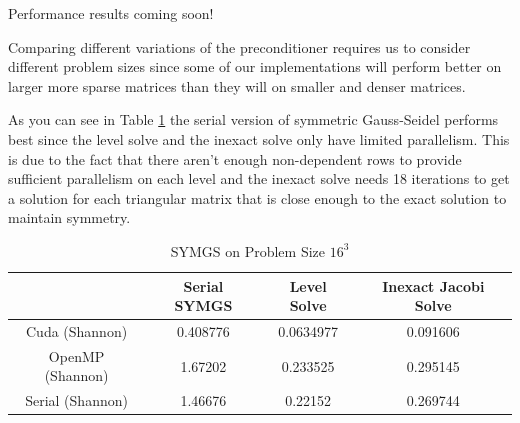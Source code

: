 \documentclass{ccr15}
\begin{document}
\begin{table}[h]
\centering
{}
 \caption{Configurations of testbed clusters}
 \label{testbeds}
\end{table}


Performance results coming soon!

Comparing different variations of the preconditioner requires us to consider different problem sizes
since some of our implementations will perform better on larger more sparse matrices than they will
on smaller and denser matrices. 

As you can see in Table \ref{SYMGS16} the serial version of symmetric Gauss-Seidel performs
best since the level solve and the inexact solve only have limited parallelism. This is due to
the fact that there aren't enough non-dependent rows to provide sufficient parallelism on each
level and the inexact solve needs 18 iterations to get a solution for each triangular matrix that
is close enough to the exact solution to maintain symmetry.

\begin{table}[h]
\begin{center}
\begin{tabular}{|c||c|c|c|}
\hline
 & Serial SYMGS & Level Solve & Inexact Jacobi Solve \\
 \hline \hline
 Cuda (Shannon) & 0.408776 & 0.0634977 & 0.091606 \\
 \hline
 OpenMP (Shannon) & 1.67202 & 0.233525 & 0.295145 \\
 \hline
 Serial (Shannon) & 1.46676 & 0.22152 & 0.269744 \\
 \hline
\end{tabular}
\caption{SYMGS on Problem Size $16^3$}
\label{SYMGS16}
\end{center}
\end{table}
\end{document}
